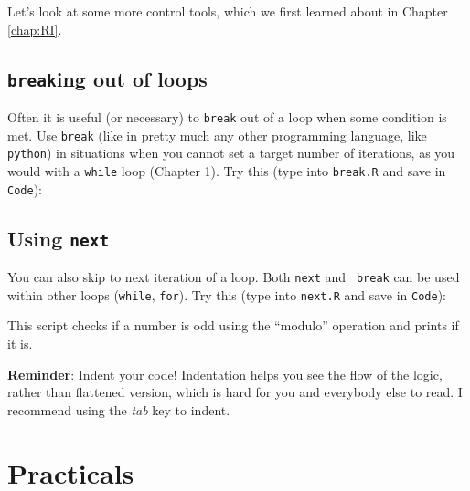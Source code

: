 Let's look at some more control tools, which we first learned about in 
Chapter \ref{chap:RI}.  

\subsection{{\tt break}ing out of loops}
Often it is useful (or necessary) to {\tt break} out of a loop when 
some condition is met. Use {\tt break} (like in pretty much any other 
programming language, like {\tt python}) in situations when you cannot 
set a target number of iterations, as you would with a {\tt while} loop 
(Chapter 1). Try this (type into {\tt break.R} and save in {\tt Code}):



\subsection{Using {\tt next}}
You can also skip to next iteration of a loop. Both {\tt next} and {\tt 
break} can be used within other loops ({\tt while}, {\tt for}). Try 
this (type into {\tt next.R} and save in {\tt Code}):



This script checks if a number is odd using the ``modulo'' 
operation and prints if it is.

\begin{tipbox}
{\bf Reminder}: Indent your code! Indentation helps you see 
the flow of the logic, rather than flattened version, which is hard for 
you and everybody else to read. I recommend using the {\it tab} key to 
indent.
\end{tipbox}

\section{Practicals}

